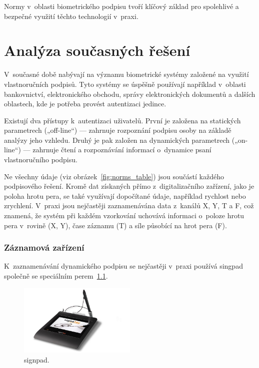 Normy v~oblasti biometrického podpisu tvoří klíčový základ pro spolehlivé a bezpečné využití těchto technologií v~praxi.


\chapter{Analýza současných řešení}

V~současné době nabývají na významu biometrické systémy založené na využití vlastnoručních podpisů. 
Tyto systémy se úspěšně používají například v~oblasti bankovnictví, elektronického obchodu, správy elektronických dokumentů a dalších oblastech, kde je potřeba provést autentizaci jedince. 

Existují dva přístupy k~autentizaci uživatelů.
První je založena na statických parametrech („off-line“) --- zahrnuje rozpoznání podpisu osoby na základě analýzy jeho vzhledu.
Druhý je pak založen na dynamických parametrech („on-line“) --- zahrnuje čtení a rozpoznávání informací o~dynamice psaní vlastnoručního podpisu.~\cite{9306154} %

Ne všechny údaje (viz obrázek~\ref{fig:norms_table}) jsou součástí každého podpisového řešení. 
Kromě dat získaných přímo z~digitalizačního zařízení, jako je poloha hrotu pera, se také využívají dopočítané údaje, například rychlost nebo zrychlení. 
V~praxi jsou nejčastěji zaznamenávána data z~kanálů X, Y, T a F, což znamená, že systém při každém vzorkování uchovává informaci o~poloze hrotu pera v~rovině (X, Y), čase záznamu (T) a síle působící na hrot pera (F).~\cite{DSM2021b}

\subsection*{Záznamová zařízení}
K~zaznamenávání dynamického podpisu se nejčastěji v~praxi používá singpad společně se speciálním perem~\ref{fig:signpad}.

\begin{figure}[h]
  \centering
  \includegraphics[width=0.5\textwidth]{obrazky-figures/signpad.jpg}
  \caption{signpad.~\cite{SignPadImage}} %
  \label{fig:signpad}
\end{figure}

